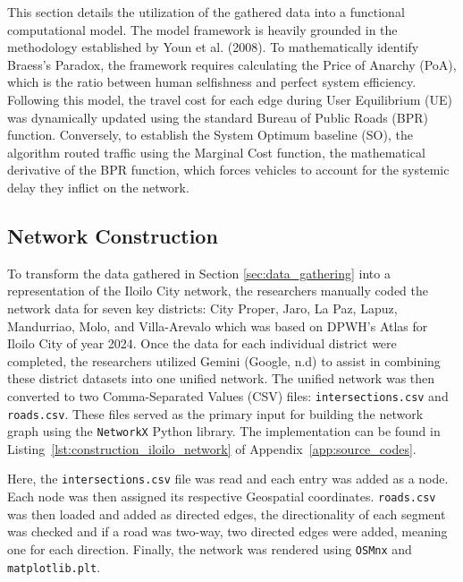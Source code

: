 This section details the utilization of the gathered data into a functional computational model. The model framework is heavily grounded in the methodology established by Youn et al. (2008). To mathematically identify Braess's Paradox, the framework requires calculating the Price of Anarchy (PoA), which is the ratio between human selfishness and perfect system efficiency. Following this model, the travel cost for each edge during User Equilibrium (UE) was dynamically updated using the standard Bureau of Public Roads (BPR) function. Conversely, to establish the System Optimum baseline (SO), the algorithm routed traffic using the Marginal Cost function, the mathematical derivative of the BPR function, which forces vehicles to account for the systemic delay they inflict on the network.

\subsection{Network Construction}
\label{sec:network_construction}
To transform the data gathered in Section \ref{sec:data_gathering} into a representation of the Iloilo City network, the researchers manually coded the network data for seven key districts: City Proper, Jaro, La Paz, Lapuz, Mandurriao, Molo, and Villa-Arevalo which was based on DPWH's Atlas for Iloilo City of year 2024. Once the data for each individual district were completed, the researchers utilized Gemini (Google, n.d) to assist in combining these district datasets into one unified network. The unified network was then converted to two Comma-Separated Values (CSV) files: \texttt{intersections.csv} and \texttt{roads.csv}. These files served as the primary input for building the network graph using the \texttt{NetworkX} Python library. The implementation can be found in Listing~\ref{lst:construction_iloilo_network} of Appendix~\ref{app:source_codes}.



Here, the \texttt{intersections.csv} file was read and each entry was added as a node. Each node was then assigned its respective Geospatial coordinates. \texttt{roads.csv} was then loaded and added as directed edges, the directionality of each segment was checked and if a road was two-way, two directed edges were added, meaning one for each direction. Finally, the network was rendered using \texttt{OSMnx} and \texttt{matplotlib.plt}. 


